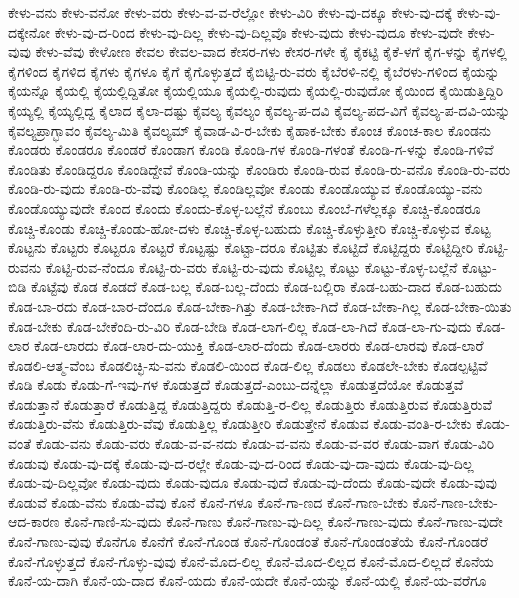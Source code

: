 {ಕೇಳು-ವನು
ಕೇಳು-ವನೋ
ಕೇಳು-ವರು
ಕೇಳು-ವ-ವ-ರೆಲ್ಲೋ
ಕೇಳು-ವಿರಿ
ಕೇಳು-ವು-ದಕ್ಕೂ
ಕೇಳು-ವು-ದಕ್ಕೆ
ಕೇಳು-ವು-ದಕ್ಕೇನೋ
ಕೇಳು-ವು-ದ-ರಿಂದ
ಕೇಳು-ವು-ದಿಲ್ಲ
ಕೇಳು-ವು-ದಿಲ್ಲವೊ
ಕೇಳು-ವುದು
ಕೇಳು-ವುದೂ
ಕೇಳು-ವುದೇ
ಕೇಳು-ವುವು
ಕೇಳು-ವೆವು
ಕೇಳೋಣ
ಕೇವಲ
ಕೇವಲ-ವಾದ
ಕೇಸರ-ಗಳು
ಕೇಸರ-ಗಳೇ
ಕೈ
ಕೈಕಟ್ಟಿ
ಕೈಕೆ-ಳಗೆ
ಕೈಗ-ಳನ್ನು
ಕೈಗಳಲ್ಲಿ
ಕೈಗಳಿಂದ
ಕೈಗಳಿದ
ಕೈಗಳು
ಕೈಗಳೂ
ಕೈಗೆ
ಕೈಗೊಳ್ಳುತ್ತದೆ
ಕೈಬಿಟ್ಟಿ-ರು-ವರು
ಕೈಬೆರಳಿ-ನಲ್ಲಿ
ಕೈಬೆರಳು-ಗಳಿಂದ
ಕೈಯನ್ನು
ಕೈಯನ್ನೊ
ಕೈಯಲ್ಲಿ
ಕೈಯಲ್ಲಿದ್ದಿತೋ
ಕೈಯಲ್ಲಿಯೂ
ಕೈಯಲ್ಲಿ-ರುವುದು
ಕೈಯಲ್ಲಿ-ರುವುದೋ
ಕೈಯಿಂದ
ಕೈಯಿಡುತ್ತಿದ್ದಿರಿ
ಕೈಯ್ಯಲ್ಲಿ
ಕೈಯ್ಯಲ್ಲಿದ್ದ
ಕೈಲಾದ
ಕೈಲಾ-ದಷ್ಟು
ಕೈವಲ್ಯ
ಕೈವಲ್ಯಂ
ಕೈವಲ್ಯ-ಪ-ದವಿ
ಕೈವಲ್ಯ-ಪದ-ವಿಗೆ
ಕೈವಲ್ಯ-ಪ-ದವಿ-ಯನ್ನು
ಕೈವಲ್ಯಪ್ರಾಗ್ಭಾವಂ
ಕೈವಲ್ಯ-ಮಿತಿ
ಕೈವಲ್ಯಮ್
ಕೈವಾಡ-ವಿ-ರ-ಬೇಕು
ಕೈಹಾಕ-ಬೇಕು
ಕೊಂಚ
ಕೊಂಚ-ಕಾಲ
ಕೊಂಡನು
ಕೊಂಡರು
ಕೊಂಡರೂ
ಕೊಂಡರೆ
ಕೊಂಡಾಗ
ಕೊಂಡಿ
ಕೊಂಡಿ-ಗಳ
ಕೊಂಡಿ-ಗಳಂತೆ
ಕೊಂಡಿ-ಗ-ಳನ್ನು
ಕೊಂಡಿ-ಗಳಿವೆ
ಕೊಂಡಿತು
ಕೊಂಡಿದ್ದರೂ
ಕೊಂಡಿದ್ದೇವೆ
ಕೊಂಡಿ-ಯನ್ನು
ಕೊಂಡಿರು
ಕೊಂಡಿ-ರುವ
ಕೊಂಡಿ-ರು-ವನೊ
ಕೊಂಡಿ-ರು-ವರು
ಕೊಂಡಿ-ರು-ವುದು
ಕೊಂಡಿ-ರು-ವೆವು
ಕೊಂಡಿಲ್ಲ
ಕೊಂಡಿಲ್ಲವೋ
ಕೊಂಡು
ಕೊಂಡೊಯ್ಯುವ
ಕೊಂಡೊಯ್ಯು-ವನು
ಕೊಂಡೊಯ್ಯುವುದೇ
ಕೊಂದ
ಕೊಂದು
ಕೊಂದು-ಕೊಳ್ಳ-ಬಲ್ಲೆನೆ
ಕೊಂಬು
ಕೊಂಬೆ-ಗಳೆಲ್ಲಕ್ಕೂ
ಕೊಚ್ಚಿ-ಕೊಂಡರೂ
ಕೊಚ್ಚಿ-ಕೊಂಡು
ಕೊಚ್ಚಿ-ಕೊಂಡು-ಹೋ-ದಳು
ಕೊಚ್ಚಿ-ಕೊಳ್ಳ-ಬಹುದು
ಕೊಚ್ಚಿ-ಕೊಳ್ಳುತ್ತೀರಿ
ಕೊಚ್ಚಿ-ಕೊಳ್ಳುವ
ಕೊಟ್ಟ
ಕೊಟ್ಟನು
ಕೊಟ್ಟರು
ಕೊಟ್ಟರೂ
ಕೊಟ್ಟರೆ
ಕೊಟ್ಟಷ್ಟು
ಕೊಟ್ಟಾ-ದರೂ
ಕೊಟ್ಟಿತು
ಕೊಟ್ಟಿದೆ
ಕೊಟ್ಟಿದ್ದರು
ಕೊಟ್ಟಿದ್ದೀರಿ
ಕೊಟ್ಟಿ-ರುವನು
ಕೊಟ್ಟಿ-ರುವ-ನೆಂದೂ
ಕೊಟ್ಟಿ-ರು-ವರು
ಕೊಟ್ಟಿ-ರು-ವುದು
ಕೊಟ್ಟಿಲ್ಲ
ಕೊಟ್ಟು
ಕೊಟ್ಟು-ಕೊಳ್ಳ-ಬಲ್ಲೆನೆ
ಕೊಟ್ಟು-ಬಿಡಿ
ಕೊಟ್ಟೆವು
ಕೊಡ
ಕೊಡದೆ
ಕೊಡ-ಬಲ್ಲ
ಕೊಡ-ಬಲ್ಲ-ದೆಂದು
ಕೊಡ-ಬಲ್ಲಿರಾ
ಕೊಡ-ಬಹು-ದಾದ
ಕೊಡ-ಬಹುದು
ಕೊಡ-ಬಾ-ರದು
ಕೊಡ-ಬಾರ-ದೆಂದೂ
ಕೊಡ-ಬೇಕಾ-ಗಿತ್ತು
ಕೊಡ-ಬೇಕಾ-ಗಿದೆ
ಕೊಡ-ಬೇಕಾ-ಗಿಲ್ಲ
ಕೊಡ-ಬೇಕಾ-ಯಿತು
ಕೊಡ-ಬೇಕು
ಕೊಡ-ಬೇಕೆಂದಿ-ರು-ವಿರಿ
ಕೊಡ-ಬೇಡಿ
ಕೊಡ-ಲಾಗ-ಲಿಲ್ಲ
ಕೊಡ-ಲಾ-ಗಿದೆ
ಕೊಡ-ಲಾ-ಗು-ವುದು
ಕೊಡ-ಲಾರ
ಕೊಡ-ಲಾರದು
ಕೊಡ-ಲಾರ-ದು-ಯುಕ್ತಿ
ಕೊಡ-ಲಾರ-ದೆಂದು
ಕೊಡ-ಲಾರರು
ಕೊಡ-ಲಾರವು
ಕೊಡ-ಲಾರೆ
ಕೊಡಲಿ-ಆತ್ಮ-ವೆಂಬ
ಕೊಡಲಿಚ್ಛಿ-ಸು-ವನು
ಕೊಡಲಿ-ಯಿಂದ
ಕೊಡ-ಲಿಲ್ಲ
ಕೊಡಲು
ಕೊಡಲೇ-ಬೇಕು
ಕೊಡಲ್ಪಟ್ಟಿವೆ
ಕೊಡಿ
ಕೊಡು
ಕೊಡು-ಗೆ-ಇವು-ಗಳ
ಕೊಡುತ್ತದೆ
ಕೊಡುತ್ತದೆ-ಎಂಬು-ದನ್ನೆಲ್ಲಾ
ಕೊಡುತ್ತದೆಯೋ
ಕೊಡುತ್ತವೆ
ಕೊಡುತ್ತಾನೆ
ಕೊಡುತ್ತಾರೆ
ಕೊಡುತ್ತಿದ್ದ
ಕೊಡುತ್ತಿದ್ದರು
ಕೊಡುತ್ತಿ-ರ-ಲಿಲ್ಲ
ಕೊಡುತ್ತಿರು
ಕೊಡುತ್ತಿರುವ
ಕೊಡುತ್ತಿರುವೆ
ಕೊಡುತ್ತಿರು-ವೆನು
ಕೊಡುತ್ತಿರು-ವೆವು
ಕೊಡುತ್ತಿಲ್ಲ
ಕೊಡುತ್ತೀರಿ
ಕೊಡುತ್ತೇನೆ
ಕೊಡುವ
ಕೊಡು-ವಂತಿ-ರ-ಬೇಕು
ಕೊಡು-ವಂತೆ
ಕೊಡು-ವನು
ಕೊಡು-ವರು
ಕೊಡು-ವ-ವ-ನದು
ಕೊಡು-ವ-ವನು
ಕೊಡು-ವ-ವರ
ಕೊಡು-ವಾಗ
ಕೊಡು-ವಿರಿ
ಕೊಡುವು
ಕೊಡು-ವು-ದಕ್ಕೆ
ಕೊಡು-ವು-ದ-ರಲ್ಲೇ
ಕೊಡು-ವು-ದ-ರಿಂದ
ಕೊಡು-ವು-ದಾ-ವುದು
ಕೊಡು-ವು-ದಿಲ್ಲ
ಕೊಡು-ವು-ದಿಲ್ಲವೋ
ಕೊಡು-ವುದು
ಕೊಡು-ವುದೂ
ಕೊಡು-ವುದೆ
ಕೊಡು-ವು-ದೆಂದು
ಕೊಡು-ವುದೇ
ಕೊಡು-ವುವು
ಕೊಡುವೆ
ಕೊಡು-ವೆನು
ಕೊಡು-ವೆವು
ಕೊನೆ
ಕೊನೆ-ಗಳೂ
ಕೊನೆ-ಗಾ-ಣದ
ಕೊನೆ-ಗಾಣ-ಬೇಕು
ಕೊನೆ-ಗಾಣ-ಬೇಕು-ಆದ-ಕಾರಣ
ಕೊನೆ-ಗಾಣಿ-ಸು-ವುದು
ಕೊನೆ-ಗಾಣು
ಕೊನೆ-ಗಾಣು-ವು-ದಿಲ್ಲ
ಕೊನೆ-ಗಾಣು-ವುದು
ಕೊನೆ-ಗಾಣು-ವುದೇ
ಕೊನೆ-ಗಾಣು-ವುವು
ಕೊನೆಗೂ
ಕೊನೆಗೆ
ಕೊನೆ-ಗೊಂಡ
ಕೊನೆ-ಗೊಂಡಂತೆ
ಕೊನೆ-ಗೊಂಡಂತೆಯೆ
ಕೊನೆ-ಗೊಂಡರೆ
ಕೊನೆ-ಗೊಳ್ಳುತ್ತದೆ
ಕೊನೆ-ಗೊಳ್ಳು-ವುವು
ಕೊನೆ-ಮೊದ-ಲಿಲ್ಲ
ಕೊನೆ-ಮೊದ-ಲಿಲ್ಲದ
ಕೊನೆ-ಮೊದ-ಲಿಲ್ಲದೆ
ಕೊನೆಯ
ಕೊನೆ-ಯ-ದಾಗಿ
ಕೊನೆ-ಯ-ದಾದ
ಕೊನೆ-ಯದು
ಕೊನೆ-ಯದೇ
ಕೊನೆ-ಯನ್ನು
ಕೊನೆ-ಯಲ್ಲಿ
ಕೊನೆ-ಯ-ವರೆಗೂ
}
